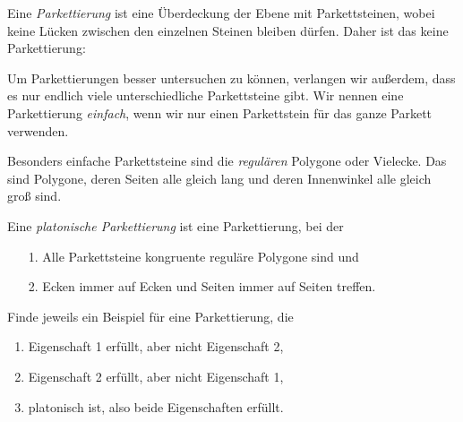 \documentclass{zusammenfassung}
\begin{document}

Eine \emph{Parkettierung} ist eine Überdeckung der Ebene mit Parkettsteinen, wobei keine Lücken zwischen den einzelnen Steinen
bleiben dürfen. Daher ist das keine Parkettierung:

\begin{center}
\end{center}

Um Parkettierungen besser untersuchen zu können, verlangen wir außerdem, dass es nur endlich viele unterschiedliche
Parkettsteine gibt. Wir nennen eine Parkettierung \emph{einfach}, wenn wir nur einen Parkettstein für das ganze Parkett verwenden.

Besonders einfache Parkettsteine sind die \emph{regulären} Polygone oder Vielecke. Das sind Polygone, deren Seiten alle gleich
lang und deren Innenwinkel alle gleich groß sind.

Eine \emph{platonische Parkettierung} ist eine Parkettierung, bei der
\begin{itemize}
  \item[1.] Alle Parkettsteine kongruente reguläre Polygone sind und
  \item[2.] Ecken immer auf Ecken und Seiten immer auf Seiten treffen.
\end{itemize}

\begin{aufgabe}
  \label{aufgabe1}
  Finde jeweils ein Beispiel für eine Parkettierung, die
  \begin{enumerate}
    \item Eigenschaft 1 erfüllt, aber nicht Eigenschaft 2,
    \item Eigenschaft 2 erfüllt, aber nicht Eigenschaft 1,
    \item platonisch ist, also beide Eigenschaften erfüllt.
  \end{enumerate}
\end{aufgabe}
\end{document}
